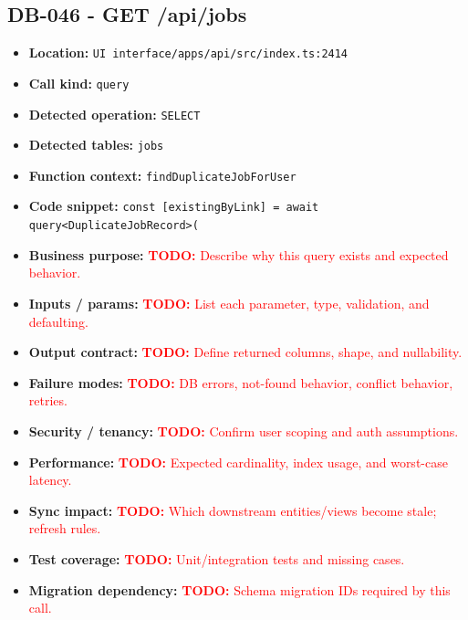 \documentclass[11pt]{article}
\newcommand{\todoitem}[1]{\textcolor{red}{\textbf{TODO:} #1}}
\begin{document}
\subsection{DB-046 - GET /api/jobs}
\begin{itemize}[leftmargin=1.5em]
\item \textbf{Location:} \texttt{UI interface/apps/api/src/index.ts:2414}
\item \textbf{Call kind:} \texttt{query}
\item \textbf{Detected operation:} \texttt{SELECT}
\item \textbf{Detected tables:} \texttt{jobs}
\item \textbf{Function context:} \texttt{findDuplicateJobForUser}
\item \textbf{Code snippet:} \texttt{const [existingByLink] = await query<DuplicateJobRecord>(}
\item \textbf{Business purpose:} \todoitem{Describe why this query exists and expected behavior.}
\item \textbf{Inputs / params:} \todoitem{List each parameter, type, validation, and defaulting.}
\item \textbf{Output contract:} \todoitem{Define returned columns, shape, and nullability.}
\item \textbf{Failure modes:} \todoitem{DB errors, not-found behavior, conflict behavior, retries.}
\item \textbf{Security / tenancy:} \todoitem{Confirm user scoping and auth assumptions.}
\item \textbf{Performance:} \todoitem{Expected cardinality, index usage, and worst-case latency.}
\item \textbf{Sync impact:} \todoitem{Which downstream entities/views become stale; refresh rules.}
\item \textbf{Test coverage:} \todoitem{Unit/integration tests and missing cases.}
\item \textbf{Migration dependency:} \todoitem{Schema migration IDs required by this call.}
\end{itemize}
\end{document}
